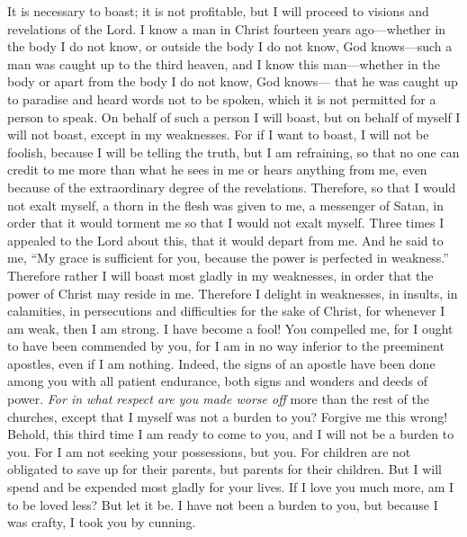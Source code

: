 \begin{biblechapter} %
 It is necessary to boast; it is not profitable, but I will proceed to visions and revelations of the Lord.
\verse I know a man in Christ fourteen years ago—whether in the body I do not know, or outside the body I do not know, God knows—such a man was caught up to the third heaven,
\verse and I know this man—whether in the body or apart from the body I do not know, God knows—
\verse that he was caught up to paradise and heard words not to be spoken, which it is not permitted for a person to speak.
\verse On behalf of such a person I will boast, but on behalf of myself I will not boast, except in my weaknesses.
\verse For if I want to boast, I will not be foolish, because I will be telling the truth, but I am refraining, so that no one can credit to me more than what he sees in me or hears anything from me,
\verse even because of the extraordinary degree of the revelations. Therefore, so that I would not exalt myself, a thorn in the flesh was given to me, a messenger of Satan, in order that it would torment me so that I would not exalt myself.
\verse Three times I appealed to the Lord about this, that it would depart from me.
\verse And he said to me, “My grace is sufficient for you, because the power is perfected in weakness.” Therefore rather I will boast most gladly in my weaknesses, in order that the power of Christ may reside in me.
\verse Therefore I delight in weaknesses, in insults, in calamities, in persecutions and difficulties for the sake of Christ, for whenever I am weak, then I am strong.
 I have become a fool! You compelled me, for I ought to have been commended by you, for I am in no way inferior to the preeminent apostles, even if I am nothing.
\verse Indeed, the signs of an apostle have been done among you with all patient endurance, both signs and wonders and deeds of power.
\verse \textit{For in what respect are you made worse off} more than the rest of the churches, except that I myself was not a burden to you? Forgive me this wrong!
\verse Behold, this third time I am ready to come to you, and I will not be a burden to you. For I am not seeking your possessions, but you. For children are not obligated to save up for their parents, but parents for their children.
\verse But I will spend and be expended most gladly for your lives. If I love you much more, am I to be loved less?
\verse But let it be. I have not been a burden to you, but because I was crafty, I took you by cunning.

\end{biblechapter}
